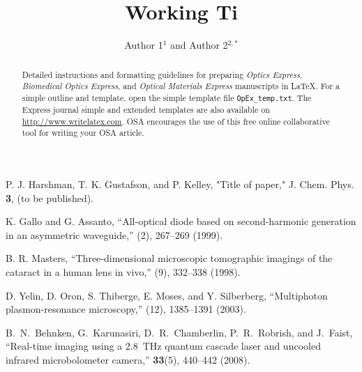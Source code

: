 \documentclass[10pt,letterpaper]{article}
\begin{document}
\title{Working Ti}
\author{Author 1$^1$ and Author 2$^{2,*}$}

\address{$^1$Department of Physics and Astronomy, University of Pennsylvania, Philadelphia, PA 19104, USA\\
$^2$Publications Department, Optical Society of America, Washington, D.C., 20036, USA}




\begin{abstract}
Detailed instructions and formatting guidelines for preparing \textit{Optics Express}, \textit{Biomedical Optics Express}, and \textit{Optical Materials Express} manuscripts in \LaTeX. For a simple outline and template, open the simple template file \texttt{OpEx\_temp.txt}. The Express journal simple and extended templates are also available on \url{http://www.writelatex.com}. OSA encourages the use of this free online collaborative tool for writing your OSA article.
\end{abstract}


\begin{thebibliography}{99}
P. J. Harshman, T. K. Gustafson, and P. Kelley, "Title of paper," J. Chem. Phys. {\bf 3}, (to be published).

 K. Gallo and G. Assanto, ``All-optical diode based on second-harmonic generation in an asymmetric waveguide,'' (2), 267--269 (1999).

 B. R. Masters, ``Three-dimensional microscopic tomographic imagings of the cataract in a human lens in vivo,'' (9), 332--338 (1998).

 D. Yelin,  D. Oron,  S. Thiberge,  E. Moses, and Y. Silberberg, ``Multiphoton plasmon-resonance microscopy,'' (12), 1385--1391 (2003).

B.~N.~Behnken, G.~Karunasiri, D.~R.~Chamberlin, P.~R.~Robrish, and J.~Faist,
``Real-time imaging using a 2.8~THz quantum cascade laser and uncooled infrared microbolometer camera,''
\ol \textbf{33}(5), 440--442 (2008).

\end{thebibliography}
\end{document}

